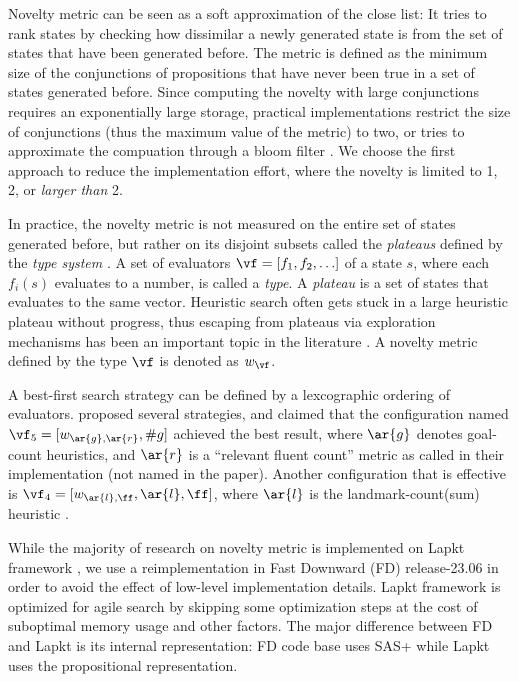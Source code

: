 
Novelty metric can be seen as a soft approximation of the close list:
It tries to rank states
by checking how dissimilar a newly generated state is from the set of states that have been generated before.
The metric is defined as the minimum size of the conjunctions of propositions that have never been true
in a set of states generated before.
%
Since computing the novelty with large conjunctions requires an exponentially large storage,
practical implementations restrict the size of conjunctions (thus the maximum value of the metric) to two,
or tries to approximate the compuation through a bloom filter \cite{singh2021approximate}.
We choose the first approach to reduce the implementation effort,
where the novelty is limited to 1, 2, or \emph{larger than} 2.

In practice,
the novelty metric is not measured on the entire set of states generated before,
but rather on its disjoint subsets called the \emph{plateaus} \citet{Asai2017b}
defined by the \emph{type system} \citet{xie14type}.
%
A set of evaluators $\vf=[f_1, f_2, \ldots]$ of a state $s$,
where each $f_i(s)$ evaluates to a number,
is called a \emph{type}.
A \emph{plateau} is a set of states that evaluates to the same vector.
Heuristic search often gets stuck in a large heuristic plateau without progress,
thus escaping from plateaus via exploration mechanisms has been an important topic
in the literature \cite{Coles07,benton2010g,imai2011novel,Asai2017b,kuroiwa2022biased}.
%
A novelty metric defined by the type $\vf$ is denoted as $w_\vf$.

A best-first search strategy can be defined by a lexcographic ordering of evaluators.
\citet{lipovetzky2017bfws} proposed several strategies,
and claimed that the configuration named $\vf_5=[w_{\ar{g},\ar{r}},\#g]$ achieved the best result,
where $\ar{g}$ denotes goal-count heuristics, and
$\ar{r}$ is a ``relevant fluent count'' metric as called in their implementation (not named in the paper).
Another configuration that is effective is $\vf_4=[w_{\ar{l}, \ff},\ar{l},\ff]$,
where $\ar{l}$ is the landmark-count(sum) heuristic \cite{buchner2023landmark}.

While the majority of research on novelty metric is implemented on Lapkt framework \cite{lapkt},
we use a reimplementation in Fast Downward (FD) release-23.06 \cite{Helmert2006}
in order to avoid the effect of low-level implementation details.
Lapkt framework is optimized for agile search by skipping some optimization steps
at the cost of suboptimal memory usage and other factors.
The major difference between FD and Lapkt is its internal representation:
FD code base uses SAS+ while Lapkt uses the propositional representation.
